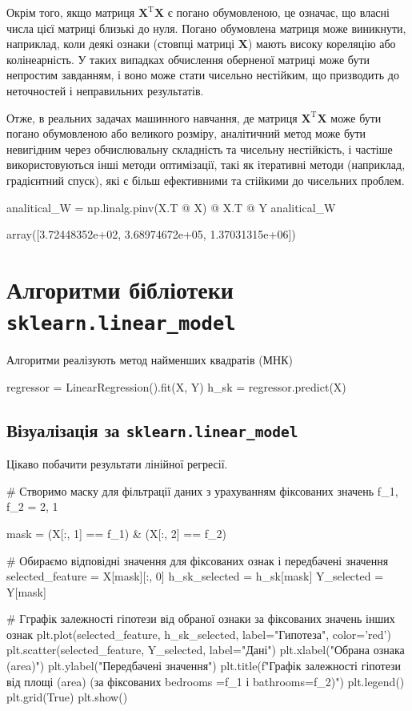 \documentclass[]{article}
\newcounter{pythoncode}
\begin{document}
Окрім того, якщо матриця \(\mathbf{X}^{\mathrm{T}} \mathbf{X}\) є погано
обумовленою, це означає, що власні числа цієї матриці близькі до нуля.
Погано обумовлена матриця може виникнути, наприклад, коли деякі ознаки
(стовпці матриці \(\mathbf{X}\)) мають високу кореляцію або
колінеарність. У таких випадках обчислення оберненої матриці може бути
непростим завданням, і воно може стати чисельно нестійким, що призводить
до неточностей і неправильних результатів.

Отже, в реальних задачах машинного навчання, де матриця
\(\mathbf{X}^{\mathrm{T}} \mathbf{X}\) може бути погано обумовленою або
великого розміру, аналітичний метод може бути невигідним через
обчислювальну складність та чисельну нестійкість, і частіше
використовуються інші методи оптимізації, такі як ітеративні методи
(наприклад, градієнтний спуск), які є більш ефективними та стійкими до
чисельних проблем.

\begin{pythoncode}
analitical_W = np.linalg.pinv(X.T @ X) @ X.T @ Y
analitical_W
\end{pythoncode}

\begin{out}
	array([3.72448352e+02, 3.68974672e+05, 1.37031315e+06])
\end{out}


\section{Алгоритми бібліотеки \texttt{sklearn.linear\_model}}

Алгоритми реалізують метод найменших квадратів (МНК)

\begin{pythoncode}
regressor = LinearRegression().fit(X, Y)
h_sk = regressor.predict(X)
\end{pythoncode}

\subsection{Візуалізація за \texttt{sklearn.linear\_model}}

Цікаво побачити результати лінійної регресії.

\begin{pythoncode}
# Створимо маску для фільтрації даних з урахуванням фіксованих значень
f_1, f_2 = 2, 1

mask = (X[:, 1] == f_1) & (X[:, 2] == f_2)

# Обираємо відповідні значення для фіксованих ознак і передбачені значення
selected_feature = X[mask][:, 0]
h_sk_selected = h_sk[mask]
Y_selected = Y[mask]

# Гграфік залежності гіпотези від обраної ознаки за фіксованих значень інших ознак
plt.plot(selected_feature, h_sk_selected, label="Гипотеза", color='red')
plt.scatter(selected_feature, Y_selected, label="Дані")
plt.xlabel("Обрана ознака (area)")
plt.ylabel("Передбачені значення")
plt.title(f"Графік залежності гіпотези від площі (area) (за фіксованих bedrooms ={f_1} і bathrooms={f_2})")
plt.legend()
plt.grid(True)
plt.show()
\end{pythoncode}
\end{document}
